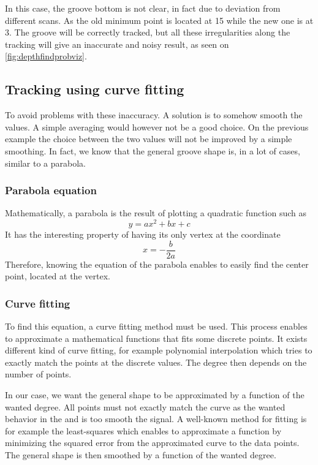 In this case, the groove bottom is not clear, in fact due to deviation from different scans. As the old minimum point is located at 15 while the new one is at 3. The groove will be correctly tracked, but all these irregularities along the tracking will give an inaccurate and noisy result, as seen on \autoref{fig:depthfindprobviz}.

\subsection{Tracking using curve fitting}
\label{sec:trackfit}

To avoid problems with these inaccuracy. A solution is to somehow smooth the values. A simple averaging would however not be a good choice. On the previous example the choice between the two values will not be improved by a simple smoothing. In fact, we know that the general groove shape is, in a lot of cases, similar to a parabola.

\subsubsection{Parabola equation}

Mathematically, a parabola is the result of plotting a quadratic function such as
\begin{equation}
y = ax^2 + bx + c
\end{equation}
It has the interesting property of having its only vertex at the coordinate
\begin{equation}
\label{eq:paravertex}
x = -\frac{b}{2a}
\end{equation}
Therefore, knowing the equation of the parabola enables to easily find the center point, located at the vertex.

\subsubsection{Curve fitting}

To find this equation, a curve fitting method must be used. This process enables to approximate a mathematical functions that fits some discrete points. It exists different kind of curve fitting, for example polynomial interpolation which tries to exactly match the points at the discrete values. The degree then depends on the number of points.

In our case, we want the general shape to be approximated by a function of the wanted degree. All points must not exactly match the curve as the wanted behavior in the and is too smooth the signal. A well-known method for fitting is for example the least-squares which enables to approximate a function by minimizing the squared error from the approximated curve to the data points. The general shape is then smoothed by a function of the wanted degree.

